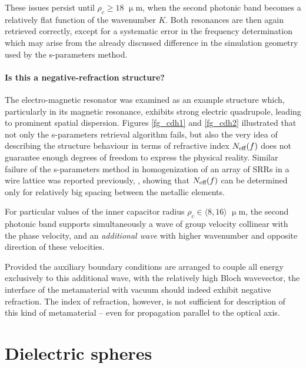 These issues persist until $\rho_c \geq 18$ $\upmu$m, when the second photonic band becomes a relatively flat function of the wavenumber $K$. Both resonances are then again retrieved correctly, except for a systematic error in the frequency determination which may arise from the already discussed difference in the simulation geometry used by the s-parameters method.

\paragraph{Is this a negative-refraction structure?}%
The electro-magnetic resonator was examined as an example structure which, particularly in its magnetic resonance, exhibits strong electric quadrupole, leading to prominent spatial dispersion. Figures \ref{fg_cdh1} and \ref{fg_cdh2} illustrated that not only the s-parameters retrieval algorithm fails, but also the very idea of describing the structure behaviour in terms of refractive index $N_{\text{eff} }(f)$ does not guarantee enough degrees of freedom to express the physical reality.
Similar failure of the s-parameters method in homogenization of an array of SRRs in a wire lattice was reported previously, \cite{rockstuhl2008transition}, showing that $N_{\text{eff} }(f)$ can be determined only for relatively big spacing between the metallic  elements.

For particular values of the inner capacitor radius $\rho_c \in \langle8,16\rangle$ $\upmu$m, the second photonic band supports simultaneously a wave of group velocity collinear with the phase velocity, and an \textit{additional wave} with higher wavenumber and opposite direction of these velocities. 

Provided the auxiliary boundary conditions are arranged to couple all energy exclusively to this additional wave, with the relatively high Bloch wavevector, the interface of the metamaterial with vacuum should indeed exhibit negative refraction. The index of refraction, however, is not sufficient for description of this kind of metamaterial -- even for propagation parallel to the optical axis.



\FloatBarrier %
\section{Dielectric spheres} %
